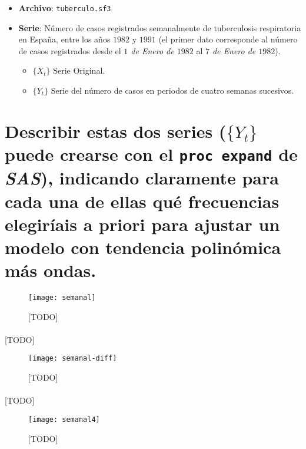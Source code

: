 \documentclass[a4paper, spanish]{article}
\begin{document}
  \maketitle

  \begin{itemize}
    \item \textbf{Archivo}: \texttt{tuberculo.sf3}
    \item \textbf{Serie}: Número de casos registrados semanalmente de tuberculosis respiratoria en España, entre los años $1982$ y $1991$ (el primer dato corresponde al número de casos registrados desde el \emph{$1$ de Enero de $1982$} al \emph{$7$ de Enero de $1982$}).
    \begin{itemize}
      \item $\{X_t\}$ Serie Original.
      \item $\{Y_t\}$ Serie del número de casos en periodos de cuatro semanas sucesivos.
    \end{itemize}
  \end{itemize}

  \section{Describir estas dos series ($\{Y_t\}$ puede crearse con el \texttt{proc expand} de \emph{SAS}), indicando claramente para cada una de ellas qué frecuencias elegiríais a priori para ajustar un modelo con tendencia polinómica más ondas.}
  \label{sec:a}


    \begin{figure}[h]
      \centering
      \texttt{[image: semanal]}
      \caption{[TODO]}
      \label{fig:fitted}
    \end{figure}

    \paragraph{}
    [TODO]


    \begin{figure}[h]
      \centering
      \texttt{[image: semanal-diff]}
      \caption{[TODO]}
      \label{fig:fitted}
    \end{figure}

    \paragraph{}
    [TODO]


    \begin{figure}[h]
      \centering
      \texttt{[image: semanal4]}
      \caption{[TODO]}
      \label{fig:fitted}
    \end{figure}
\end{document}
